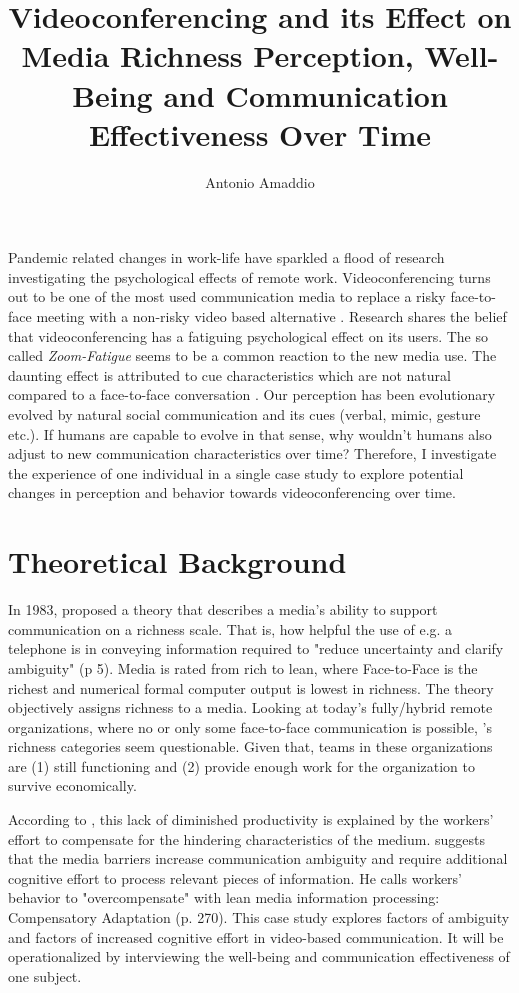 \documentclass[man]{apa7}
\title{Videoconferencing and its Effect on Media Richness Perception, Well-Being and Communication Effectiveness Over Time}
\author{Antonio Amaddio}
\affiliation{Freie Universität Berlin \\ A\&O Vertiefung, Winter 2022/23, Supervisor: Dr. Lisa Handke}
\begin{document}
\maketitle
Pandemic related changes in work-life have sparkled a flood of research investigating the psychological effects of remote work. Videoconferencing turns out to be one of the most used communication media to replace a risky face-to-face meeting with a non-risky video based alternative \parencite{Riedl2021}.  Research shares the belief that videoconferencing has a fatiguing psychological effect on its users. The so called \textit{Zoom-Fatigue} seems to be a common reaction to the new media use. The daunting effect is attributed to cue characteristics which are not natural compared to a face-to-face conversation \parencite{Riedl2021}. Our perception has been evolutionary evolved by natural social communication and its cues (verbal, mimic, gesture etc.). If humans are capable to evolve in that sense, why wouldn't humans also adjust to new communication characteristics over time? Therefore, I investigate the experience of one individual in a single case study to explore potential changes in perception and behavior towards videoconferencing over time.

\section{Theoretical Background}

In 1983, \citeauthor{daft1983information} proposed a theory that describes a media’s ability to support communication on a richness scale. That is, how helpful the use of e.g. a telephone is in conveying information required to "reduce uncertainty and clarify ambiguity" (p 5). Media is rated from rich to lean, where Face-to-Face is the richest and numerical formal computer output is lowest in richness. The theory objectively assigns richness to a media. Looking at today’s fully/hybrid remote organizations, where no or only some face-to-face communication is possible, \citeauthor{daft1983information}'s richness categories seem questionable. Given that, teams in these organizations are (1) still functioning and (2) provide enough work for the organization to survive economically.

According to \citeauthor{Kock2005}, this lack of diminished productivity is explained by the workers' effort to compensate for the hindering characteristics of the medium. \citeauthor{Kock2005} suggests that the media barriers increase communication ambiguity and require additional cognitive effort to process relevant pieces of information. He calls workers' behavior to "overcompensate" with lean media information processing: Compensatory Adaptation (p. 270). This case study explores factors of ambiguity and factors of increased cognitive effort in video-based communication. It will be operationalized by interviewing the well-being and communication effectiveness of one subject.
\end{document}

